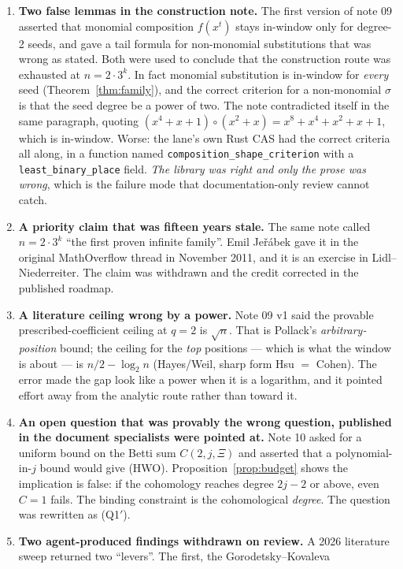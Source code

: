 \documentclass[10pt]{article}
\theoremstyle{plain}
\theoremstyle{definition}
\begin{document}
\begin{enumerate}[label=\arabic*.]
\item \textbf{Two false lemmas in the construction note.} The first version of
note 09 asserted that monomial composition $f(x^t)$ stays in-window only for
degree-2 seeds, and gave a tail formula for non-monomial substitutions that was
wrong as stated. Both were used to conclude that the construction route was
exhausted at $n=2\cdot3^k$. In fact monomial substitution is in-window for
\emph{every} seed (Theorem~\ref{thm:family}), and the correct criterion for a
non-monomial $\sigma$ is that the seed degree be a power of two. The note
contradicted itself in the same paragraph, quoting
$(x^4+x+1)\circ(x^2+x)=x^8+x^4+x^2+x+1$, which is in-window. Worse: the lane's
own Rust CAS had the correct criteria all along, in a function named
\texttt{composition\_shape\_criterion} with a
\texttt{least\_binary\_place} field. \emph{The library was right and only the
prose was wrong}, which is the failure mode that documentation-only review
cannot catch.
\item \textbf{A priority claim that was fifteen years stale.} The same note
called $n=2\cdot3^k$ ``the first proven infinite family''. Emil Je\v{r}\'abek
gave it in the original MathOverflow thread in November 2011, and it is an
exercise in Lidl--Niederreiter. The claim was withdrawn and the credit corrected
in the published roadmap.
\item \textbf{A literature ceiling wrong by a power.} Note 09 v1 said the
provable prescribed-coefficient ceiling at $q=2$ is $\sqrt n$. That is
Pollack's \emph{arbitrary-position} bound; the ceiling for the \emph{top}
positions --- which is what the window is about --- is $n/2-\log_2n$
(Hayes/Weil, sharp form Hsu $=$ Cohen). The error made the gap look like a
power when it is a logarithm, and it pointed effort away from the analytic
route rather than toward it.
\item \textbf{An open question that was provably the wrong question, published
in the document specialists were pointed at.} Note 10 asked for a uniform bound
on the Betti sum $C(2,j,\Xi)$ and asserted that a polynomial-in-$j$ bound would
give (HWO). Proposition~\ref{prop:budget} shows the implication is false: if
the cohomology reaches degree $2j-2$ or above, even $C=1$ fails. The binding
constraint is the cohomological \emph{degree}. The question was rewritten as
(Q1$'$).
\item \textbf{Two agent-produced findings withdrawn on review.} A 2026
literature sweep returned two ``levers''. The first, the Gorodetsky--Kovaleva

\end{enumerate}
\end{document}
